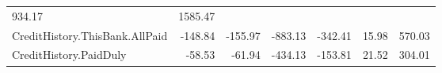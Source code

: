 \documentclass[]{article}
\begin{document}
\begin{longtable}[]{@{}lrrrrrr@{}}
\begin{minipage}[t]{0.08\columnwidth}
934.17\strut
\end{minipage} & \begin{minipage}[t]{0.08\columnwidth}\raggedleft\strut
1585.47\strut
\end{minipage}\tabularnewline
\begin{minipage}[t]{0.31\columnwidth}\raggedright\strut
CreditHistory.ThisBank.AllPaid\strut
\end{minipage} & \begin{minipage}[t]{0.10\columnwidth}\raggedleft\strut
-148.84\strut
\end{minipage} & \begin{minipage}[t]{0.08\columnwidth}\raggedleft\strut
-155.97\strut
\end{minipage} & \begin{minipage}[t]{0.08\columnwidth}\raggedleft\strut
-883.13\strut
\end{minipage} & \begin{minipage}[t]{0.08\columnwidth}\raggedleft\strut
-342.41\strut
\end{minipage} & \begin{minipage}[t]{0.08\columnwidth}\raggedleft\strut
15.98\strut
\end{minipage} & \begin{minipage}[t]{0.08\columnwidth}\raggedleft\strut
570.03\strut
\end{minipage}\tabularnewline
\begin{minipage}[t]{0.31\columnwidth}\raggedright\strut
CreditHistory.PaidDuly\strut
\end{minipage} & \begin{minipage}[t]{0.10\columnwidth}\raggedleft\strut
-58.53\strut
\end{minipage} & \begin{minipage}[t]{0.08\columnwidth}\raggedleft\strut
-61.94\strut
\end{minipage} & \begin{minipage}[t]{0.08\columnwidth}\raggedleft\strut
-434.13\strut
\end{minipage} & \begin{minipage}[t]{0.08\columnwidth}\raggedleft\strut
-153.81\strut
\end{minipage} & \begin{minipage}[t]{0.08\columnwidth}\raggedleft\strut
21.52\strut
\end{minipage} & \begin{minipage}[t]{0.08\columnwidth}\raggedleft\strut
304.01\strut
\end{minipage}\tabularnewline

\end{longtable}
\end{document}
